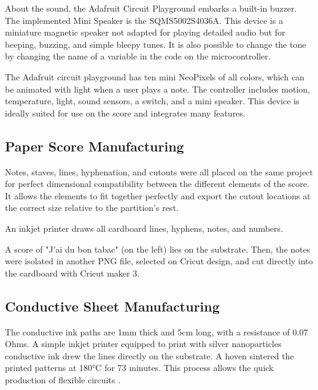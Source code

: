 About the sound, the Adafruit Circuit Playground embarks a built-in buzzer. The implemented Mini Speaker is the SQMS5002S4036A. This device is a miniature magnetic speaker not adapted for playing detailed audio but for beeping, buzzing, and simple bleepy tunes. It is also possible to change the tone by changing the name of a variable in the code on the microcontroller.

The Adafruit circuit playground has ten mini NeoPixels of all colors, which can be animated with light when a user plays a note. The controller includes motion, temperature, light, sound sensors, a switch, and a mini speaker. This device is ideally suited for use on the score and integrates many features.

\subsection{Paper Score Manufacturing}

Notes, staves, lines, hyphenation, and cutouts were all placed on the same project for perfect dimensional compatibility between the different elements of the score. It allows the elements to fit together perfectly and export the cutout locations at the correct size relative to the partition's rest.

An inkjet printer draws all cardboard lines, hyphens, notes, and numbers.

A score of "J'ai du bon tabac" (on the left) lies on the substrate. Then, the notes were isolated in another PNG file, selected on Cricut design, and cut directly into the cardboard with Cricut maker 3.


\subsection{Conductive Sheet Manufacturing}

The conductive ink paths are 1mm thick and 5cm long, with a resistance of 0.07 Ohms. A simple inkjet printer equipped to print with silver nanoparticles conductive ink drew the lines directly on the substrate. A hoven sintered the printed patterns at 180°C for 73 minutes. This process allows the quick production of flexible circuits \cite{khan2019soft}.

